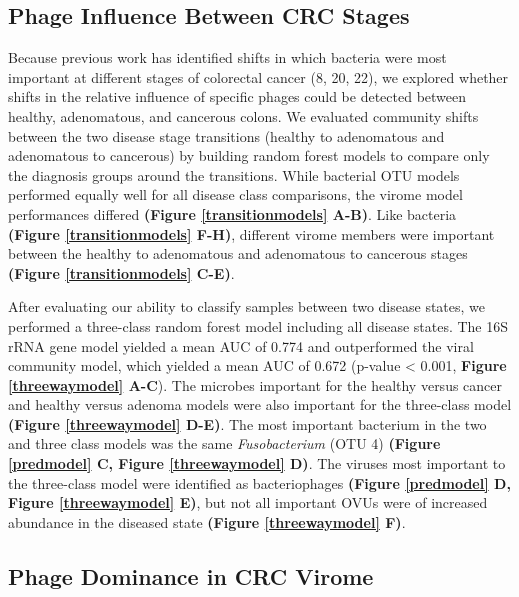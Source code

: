 \documentclass[12pt,]{article}
\begin{document}
\subsection{Phage Influence Between CRC
Stages}\label{phage-influence-between-crc-stages}

Because previous work has identified shifts in which bacteria were most
important at different stages of colorectal cancer (8, 20, 22), we
explored whether shifts in the relative influence of specific phages
could be detected between healthy, adenomatous, and cancerous colons. We
evaluated community shifts between the two disease stage transitions
(healthy to adenomatous and adenomatous to cancerous) by building random
forest models to compare only the diagnosis groups around the
transitions. While bacterial OTU models performed equally well for all
disease class comparisons, the virome model performances differed
\textbf{(Figure \ref{transitionmodels} A-B)}. Like bacteria
\textbf{(Figure \ref{transitionmodels} F-H)}, different virome members
were important between the healthy to adenomatous and adenomatous to
cancerous stages \textbf{(Figure \ref{transitionmodels} C-E)}.

After evaluating our ability to classify samples between two disease
states, we performed a three-class random forest model including all
disease states. The 16S rRNA gene model yielded a mean AUC of 0.774 and
outperformed the viral community model, which yielded a mean AUC of
0.672 (p-value \textless{} 0.001, \textbf{Figure \ref{threewaymodel}
A-C}). The microbes important for the healthy versus cancer and healthy
versus adenoma models were also important for the three-class model
\textbf{(Figure \ref{threewaymodel} D-E)}. The most important bacterium
in the two and three class models was the same \emph{Fusobacterium} (OTU
4) \textbf{(Figure \ref{predmodel} C, Figure \ref{threewaymodel} D)}.
The viruses most important to the three-class model were identified as
bacteriophages \textbf{(Figure \ref{predmodel} D, Figure
\ref{threewaymodel} E)}, but not all important OVUs were of increased
abundance in the diseased state \textbf{(Figure \ref{threewaymodel} F)}.

\subsection{Phage Dominance in CRC
Virome}\label{phage-dominance-in-crc-virome}
\end{document}
